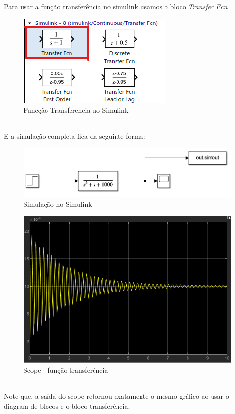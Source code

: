 \documentclass[a4paper, 12pt]{article}
\begin{document}
	Para usar a função transferência no simulink usamos o bloco \textit{Transfer Fcn}
	\begin{figure}[h]
		\center
		\includegraphics[scale=0.7]{Imagens/ft_s.png}
		\caption{Funcção Transferencia no Simulink}
	\end{figure}\\
	E a simulação completa fica da seguinte forma:
	\begin{figure}[h]
		\center
		\includegraphics[scale=0.5]{Imagens/sim.png}
		\caption{Simulação no Simulink}
	\end{figure}
	\begin{figure}[h]
		\center
		\includegraphics[scale=0.5]{Imagens/scope.png}
		\caption{Scope - função transferência}
	\end{figure}\\
Note que, a saída do scope retornou exatamente o mesmo gráfico ao usar o diagram de blocos e o bloco transferência.
\newpage
\end{document}
